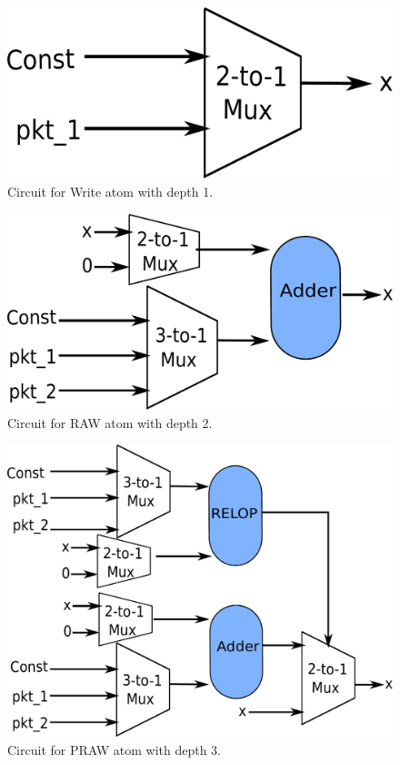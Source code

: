 \newpage 
\begin{figure}[!htbp]
  \center
  \includegraphics[width=\columnwidth]{rw.pdf}
  \caption{Circuit for Write atom with depth 1.}
  \label{fig:rw}
\end{figure}
\begin{figure}[!htbp]
  \center
  \includegraphics[width=\columnwidth]{raw.pdf}
  \caption{Circuit for RAW atom with depth 2.}
  \label{fig:raw}
\end{figure}
\begin{figure}[!htbp]
  \center
  \includegraphics[width=\columnwidth]{pred_raw.pdf}
  \caption{Circuit for PRAW atom with depth 3.}
  \label{fig:praw}
\end{figure}
